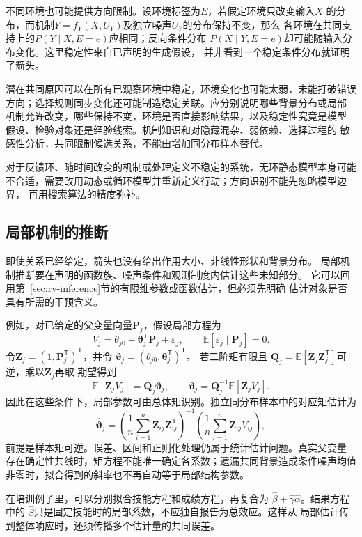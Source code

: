 不同环境也可能提供方向限制。设环境标签为\(E\)，若假定环境只改变输入\(X\)
的分布，而机制\(Y=f_Y(X,U_Y)\)及独立噪声\(U_Y\)的分布保持不变，那么
各环境在共同支持上的\(P(Y\mid X,E=e)\)应相同；反向条件分布
\(P(X\mid Y,E=e)\)却可能随输入分布变化。这里稳定性来自已声明的生成假设，
并非看到一个稳定条件分布就证明了箭头。

潜在共同原因可以在所有已观察环境中稳定，环境变化也可能太弱，未能打破错误
方向；选择规则同步变化还可能制造稳定关联。应分别说明哪些背景分布或局部
机制允许改变，哪些保持不变，环境是否直接影响结果，以及稳定性究竟是模型
假设、检验对象还是经验线索。机制知识和对隐藏混杂、弱依赖、选择过程的
敏感性分析，共同限制候选关系，不能由增加同分布样本替代。

对于反馈环、随时间改变的机制或处理定义不稳定的系统，无环静态模型本身可能
不合适，需要改用动态或循环模型并重新定义行动；方向识别不能先忽略模型边界，
再用搜索算法的精度弥补。

\subsection{局部机制的推断}
\label{sec:causal-local-mechanism-inference}

即使关系已经给定，箭头也没有给出作用大小、非线性形状和背景分布。
局部机制推断要在声明的函数族、噪声条件和观测制度内估计这些未知部分。
它可以回用第~\ref{sec:rv-inference}节的有限维参数或函数估计，但必须先明确
估计对象是否具有所需的干预含义。

例如，对已给定的父变量向量\(\bm P_j\)，假设局部方程为
\[
  V_j=\theta_{j0}+\bm\theta_j^{\mathsf T}\bm P_j+\varepsilon_j,
  \qquad
  \mathbb E[\varepsilon_j\mid\bm P_j]=0.
\]
令\(\bm Z_j=(1,\bm P_j^{\mathsf T})^{\mathsf T}\)，并令
\(\bm\vartheta_j=(\theta_{j0},\bm\theta_j^{\mathsf T})^{\mathsf T}\)。
若二阶矩有限且
\(\bm Q_j=\mathbb E[\bm Z_j\bm Z_j^{\mathsf T}]\)可逆，乘以\(\bm Z_j\)再取
期望得到
\[
  \mathbb E[\bm Z_jV_j]=\bm Q_j\bm\vartheta_j,\qquad
  \bm\vartheta_j
  =\bm Q_j^{-1}\mathbb E[\bm Z_jV_j].
\]
因此在这些条件下，局部参数可由总体矩识别。独立同分布样本中的对应矩估计为
\[
  \widehat{\bm\vartheta}_j
  =
  \left(\frac1n\sum_{i=1}^n\bm Z_{ij}\bm Z_{ij}^{\mathsf T}\right)^{-1}
  \left(\frac1n\sum_{i=1}^n\bm Z_{ij}V_{ij}\right),
\]
前提是样本矩可逆。误差、区间和正则化处理仍属于统计估计问题。真实父变量
存在确定性共线时，矩方程不能唯一确定各系数；遗漏共同背景造成条件噪声均值
非零时，拟合得到的斜率也不再自动等于局部结构参数。

在培训例子里，可以分别拟合技能方程和成绩方程，再复合为
\(\widehat\beta+\widehat\gamma\widehat\alpha\)。结果方程中的
\(\widehat\beta\)只是固定技能时的局部系数，不应独自报告为总效应。这样从
局部估计传到整体响应时，还须传播多个估计量的共同误差。

